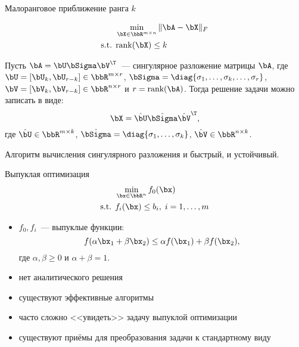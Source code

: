 \documentclass[12pt]{beamer}
\begin{document}
\begin{frame}{Малоранговое приближение ранга $k$}

\begin{equation*}
\begin{split}
&\min\limits_{\bX \in \bbR^{m \times n}} \|\bA - \bX \|_F \\
\text{s.t. } & \text{rank}(\bX) \leq k
\end{split}
\end{equation*}

\begin{Theorem}
Пусть $\bA = \bU\bSigma\bV^{\T}$~--- сингулярное разложение матрицы $\bA$, где $\bU = [\bU_k, \bU_{r-k}] \in \bbR^{m \times r}$, $\bSigma = \diag{\sigma_1, \ldots, \sigma_k, \ldots, \sigma_r}$, $\bV = [\bV_k, \bV_{r - k}] \in \bbR^{n \times r}$ и $r = \text{rank}(\bA)$.  Тогда решение задачи можно записать в виде:
\[
\bX = \hat{\bU} \hat{\bSigma} \hat{\bV}^{\T},
\]
где $\hat{\bU} \in \bbR^{m \times k}$, $\hat{\bSigma} = \diag{\sigma_1, \ldots, \sigma_k}$, $\hat{\bV} \in \bbR^{n \times k}$.
\end{Theorem}
\small Алгоритм вычисления сингулярного разложения и быстрый, и устойчивый.
\end{frame}

\begin{frame}{Выпуклая оптимизация}
\begin{equation*}
\begin{split}
&\min\limits_{\bx \in \bbR^n} f_0(\bx)\\
\text{s.t. } & f_i(\bx) \leq b_i, \; i = 1,\ldots, m
\end{split}
\label{eq::conv_opt}
\end{equation*}
\begin{itemize}[<+->]
\item $f_0, f_i$~--- выпуклые функции:
\[
f(\alpha \bx_1 + \beta \bx_2) \leq \alpha f(\bx_1) + \beta f(\bx_2),
\]
где $\alpha, \beta \geq 0$ и $\alpha + \beta = 1$.
\item нет аналитического решения
\item существуют эффективные алгоритмы
\item часто сложно <<увидеть>> задачу выпуклой оптимизации
\item существуют приёмы для преобразования задачи к стандартному виду
\end{itemize}
\end{frame}
\end{document}
